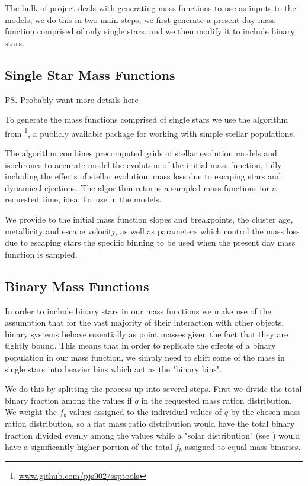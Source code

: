 The bulk of project deals with generating mass functions to use as inputs to the 
models, we do this in two main steps, we first generate a present day mass function comprised of
only single stars, and we then modify it to include binary stars.

\subsection{Single Star Mass Functions}

\ps{Probably want more details here}

To generate the mass functions comprised of single stars we use the \evolvemf{} algorithm from
\footnote{\url{www.github.com/pjs902/ssptools}}, a publicly available package for
working with simple stellar populations.

The \evolvemf{} algorithm combines precomputed grids of stellar evolution models and isochrones to
accurate model the evolution of the initial mass function, fully including the effects of stellar
evolution, mass loss due to escaping stars and dynamical ejections. The algorithm returns a sampled
mass functions for a requested time, ideal for use in the  models.

We provide to \evolvemf{} the initial mass function slopes and breakpoints, the cluster age,
metallicity and escape velocity, as well as parameters which control the mass loss due to escaping
stars the specific binning to be used when the present day mass function is sampled.



\subsection{Binary Mass Functions}

In order to include binary stars in our mass functions we make use of the assumption that for the
vast majority of their interaction with other objects, binary systems behave essentially as point
masses given the fact that they are tightly bound. This means that in order to replicate the effects
of a binary population in our mass function, we simply need to shift some of the mass in single
stars into heavier bins which act as the "binary bins".


We do this by splitting the process up into several steps. First we divide the total binary fraction
among the values if $q$ in the requested mass ration distribution. We weight the $f_b$ values
assigned to the individual values of $q$ by the chosen mass ration distribution, so a flat mass
ratio distribution would have the total binary fraction divided evenly among the values while a
"solar distribution" (see \citealt{Fisher2005}) would have a significantly higher portion of the
total $f_b$ assigned to equal mass binaries.

